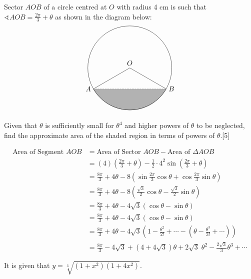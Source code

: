 \documentclass[12pt, a4 paper]{article}
\begin{document}
\begin{outline}[enumerate]
 \1 Sector \(AOB\) of a circle centred at \(O\) with radius 4 cm is such that \(\sphericalangle AOB = \frac{2\pi}{3}+\theta \) as shown in the diagram below: %
 \[
  \begin{tikzpicture}
   \draw (0,0) node[above]{\(O\)} circle (60pt);
   \draw (-51.96152pt,-30pt) node[left]{\(A\)} -- (0,0);
   \draw (51.96152pt,-30pt) node[right]{\(B\)} -- (0,0);
   \filldraw[color=white!70!black,draw=black] (-51.96152pt,-30pt) arc (210:330:60pt);
   \draw[dotted](-51.96152pt,-30pt) -- (51.96152pt,-30pt);
  \end{tikzpicture}
 \]
 Given that \(\theta \) is sufficiently small for \(\theta^4\) and higher powers of \(\theta \) to be neglected, find the approximate area of the shaded region in terms of powers of \(\theta \).\hfill[5]
 \begin{answer}
  \begin{align*}
   \textrm{Area of Segment }AOB & = \textrm{Area of Sector }AOB -\textrm{Area of } \Delta AOB                                                                        \\
                                & = (4)\left(\frac{2\pi}{3}+\theta \right) - \frac{1}{2}\cdot{4}^2 \sin {\left(\frac{2\pi}{3}+\theta\right)}                         \\
                                & = \frac{8\pi}{3}+4\theta - 8\left(\sin{\frac{2\pi}{3}}\cos{\theta}+\cos{\frac{2\pi}{3}}\sin{\theta}\right)                         \\
                                & = \frac{8\pi}{3}+4\theta - 8\left({\frac{\sqrt{3}}{2}}\cos{\theta}-\frac{\sqrt{3}}{2}\sin{\theta}\right)                           \\
                                & = \frac{8\pi}{3}+4\theta - 4\sqrt{3}(\cos{\theta}-\sin{\theta})                                                                    \\
                                & = \frac{8\pi}{3}+4\theta - 4\sqrt{3}(\cos{\theta}-\sin{\theta})                                                                    \\
                                & = \frac{8\pi}{3}+4\theta - 4\sqrt{3}\left(1-\frac{\theta^2}{2!} + \cdots - \left(\theta-\frac{\theta^3}{3!} + \cdots\right)\right) \\
                                & = \frac{8\pi}{3}-4\sqrt{3}+(4+4\sqrt{3})\theta + 2\sqrt{3}\;\theta^2-\frac{2\sqrt{3}}{3}\theta^3+\cdots
  \end{align*}
 \end{answer}
 \1 It is given that \(y=\sqrt[3]{(1+x^2)(1+4x^2)}\). %


\end{outline}
\end{document}
